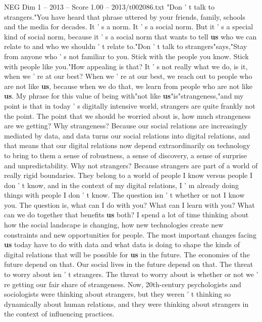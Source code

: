 \begin{textsample}{NEG Dim 1 – 2013 – Score 1.00 – 2013/t002086.txt}  \label{ex:f1_neg_039}
"Don ' t talk to strangers."You have heard that phrase uttered by your friends, family, schools and the media for decades.
It ' s a norm.
It ' s a social norm.
But it ' s a special kind of social norm, because it ' s a social norm that wants to tell \textbf{us} who we can relate to and who we shouldn ' t relate to."Don ' t talk to strangers"says,"Stay from anyone who ' s not familiar to you.
Stick with the people you know.
Stick with people like you."How appealing is that?
It ' s not really what we do, is it, when we ' re at our best?
When we ' re at our best, we reach out to people who are not like \textbf{us}, because when we do that, we learn from people who are not like \textbf{us}.
My phrase for this value of being with"not like \textbf{us}"is"strangeness,"and my point is that in today ' s digitally intensive world, strangers are quite frankly not the point.
The point that we should be worried about is, how much strangeness are we getting?
Why strangeness?
Because our social relations are increasingly mediated by data, and data turns our social relations into digital relations, and that means that our digital relations now depend extraordinarily on technology to bring to them a sense of robustness, a sense of discovery, a sense of surprise and unpredictability.
Why not strangers?
Because strangers are part of a world of really rigid boundaries.
They belong to a world of people I know versus people I don ' t know, and in the context of my digital relations, I ' m already doing things with people I don ' t know.
The question isn ' t whether or not I know you.
The question is, what can I do with you?
What can I learn with you?
What can we do together that benefits \textbf{us} both?
I spend a lot of time thinking about how the social landscape is changing, how new technologies create new constraints and new opportunities for people.
The most important changes facing \textbf{us} today have to do with data and what data is doing to shape the kinds of digital relations that will be possible for \textbf{us} in the future.
The economies of the future depend on that.
Our social lives in the future depend on that.
The threat to worry about isn ' t strangers.
The threat to worry about is whether or not we ' re getting our fair share of strangeness.
Now, 20th-century psychologists and sociologists were thinking about strangers, but they weren ' t thinking so dynamically about human relations, and they were thinking about strangers in the context of influencing practices.

\end{textsample}
